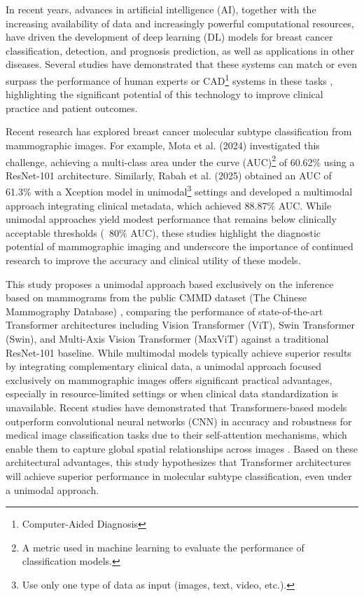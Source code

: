 \documentclass[a4paper,10pt]{book}
\begin{document}
In recent years, advances in artificial intelligence (AI), together with the increasing availability of data and increasingly powerful computational resources, have driven the development of deep learning (DL) models for breast cancer classification, detection, and prognosis prediction, as well as applications in other diseases. Several studies have demonstrated that these systems can match or even surpass the performance of human experts or CAD\footnote{Computer-Aided Diagnosis} systems in these tasks \cite{mckinney_international_2020,pattanaik_breast_2022,meenalochini_deep_2024,hussain_performance_2025}, highlighting the significant potential of this technology to improve clinical practice and patient outcomes.

Recent research has explored breast cancer molecular subtype classification from mammographic images. For example, Mota et al. (2024) \cite{mota_breast_2024} investigated this challenge, achieving a multi-class area under the curve (AUC)\footnote{A metric used in machine learning to evaluate the performance of classification models.} of 60.62\% using a ResNet-101 architecture. Similarly, Rabah et al. (2025) \cite{ben_rabah_multimodal_2025} obtained an AUC of 61.3\% with a Xception model in unimodal\footnote{Use only one type of data as input (images, text, video, etc.).} settings and developed a multimodal approach integrating clinical metadata, which achieved 88.87\% AUC. While unimodal approaches yield modest performance that remains below clinically acceptable thresholds (~80\% AUC), these studies highlight the diagnostic potential of mammographic imaging and underscore the importance of continued research to improve the accuracy and clinical utility of these models.

This study proposes a unimodal approach based exclusively on the inference based on mammograms from the public CMMD dataset (The Chinese Mammography Database) \cite{cai_online_2023}, comparing the performance of state-of-the-art Transformer architectures including Vision Transformer (ViT), Swin Transformer (Swin), and Multi-Axis Vision Transformer (MaxViT) against a traditional ResNet-101 baseline. While multimodal models typically achieve superior results by integrating complementary clinical data, a unimodal approach focused exclusively on mammographic images offers significant practical advantages, especially in resource-limited settings or when clinical data standardization is unavailable. Recent studies have demonstrated that Transformers-based models outperform convolutional neural networks (CNN) in accuracy and robustness for medical image classification tasks due to their self-attention mechanisms, which enable them to capture global spatial relationships across images \cite{mauricio_comparing_2023}. Based on these architectural advantages, this study hypothesizes that Transformer architectures will achieve superior performance in molecular subtype classification, even under a unimodal approach.
\end{document}
